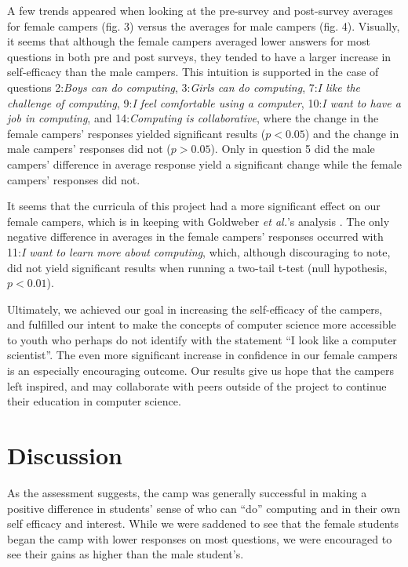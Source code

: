 A few trends appeared when looking at the pre-survey and post-survey
averages for female campers (fig. 3) versus the averages for male
campers (fig. 4). Visually, it seems that although the female
campers averaged lower answers for most questions in both pre and
post surveys, they tended to have a larger increase in self-efficacy
than the male campers. This intuition is supported in the case of
questions 2:\textit{Boys can do computing}, 3:\textit{Girls can do
computing}, 7:\textit{I like the challenge of computing}, 9:\textit{I
feel comfortable using a computer}, 10:\textit{I want to have a job
in computing}, and 14:\textit{Computing is collaborative}, where
the change in the female campers' responses yielded significant
results ($p < 0.05$) and the change in male campers' responses did
not ($p > 0.05$). Only in question 5 did the male campers' difference
in average response yield a significant change while the female
campers' responses did not.

It seems that the curricula of this project had a more significant
effect on our female campers, which is in keeping with Goldweber
\textit{et al.}'s analysis \cite{Goldweber2013}.  The only negative
difference in averages in the female campers' responses occurred
with 11:\textit{I want to learn more about computing}, which,
although discouraging to note, did not yield significant results
when running a two-tail t-test (null hypothesis, $p < 0.01$).

Ultimately, we achieved our goal in increasing the self-efficacy
of the campers, and fulfilled our intent to make the concepts of
computer science more accessible to youth who perhaps do not identify
with the statement ``I look like a computer scientist''. The even
more significant increase in confidence in our female campers is
an especially encouraging outcome. Our results give us hope that
the campers left inspired, and may collaborate with peers outside
of the project to continue their education in computer science.

\section{Discussion}

As the assessment suggests, the camp was generally successful in
making a positive difference in students' sense of who can ``do''
computing and in their own self efficacy and interest.  While we
were saddened to see that the female students began the camp with
lower responses on most questions, we were encouraged to see their
gains as higher than the male student's.

